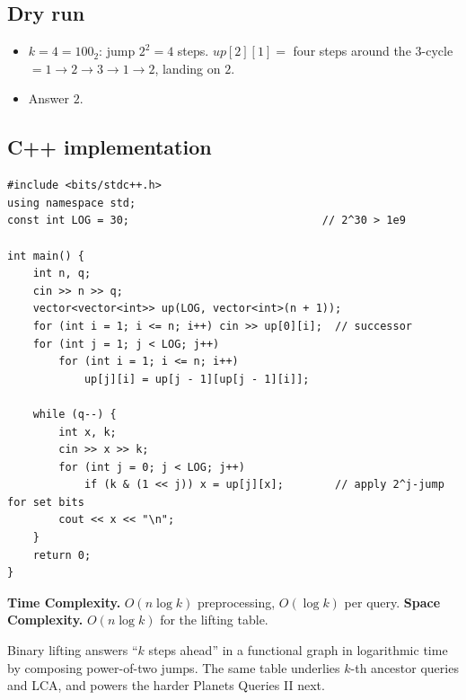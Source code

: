 \subsection*{Dry run}


\begin{itemize}
  \item $k=4=100_2$: jump $2^2=4$ steps. $\textit{up}[2][1]=$ four steps
        around the 3-cycle $=1\to2\to3\to1\to2$, landing on $2$.
  \item Answer $2$.
\end{itemize}

\subsection*{C++ implementation}

\begin{lstlisting}
#include <bits/stdc++.h>
using namespace std;
const int LOG = 30;                              // 2^30 > 1e9

int main() {
    int n, q;
    cin >> n >> q;
    vector<vector<int>> up(LOG, vector<int>(n + 1));
    for (int i = 1; i <= n; i++) cin >> up[0][i];  // successor
    for (int j = 1; j < LOG; j++)
        for (int i = 1; i <= n; i++)
            up[j][i] = up[j - 1][up[j - 1][i]];

    while (q--) {
        int x, k;
        cin >> x >> k;
        for (int j = 0; j < LOG; j++)
            if (k & (1 << j)) x = up[j][x];        // apply 2^j-jump for set bits
        cout << x << "\n";
    }
    return 0;
}
\end{lstlisting}

\begin{complexitybox}
\textbf{Time Complexity.} $O(n\log k)$ preprocessing, $O(\log k)$ per query.
\textbf{Space Complexity.} $O(n\log k)$ for the lifting table.
\end{complexitybox}

\begin{takeawaybox}
Binary lifting answers ``$k$ steps ahead'' in a functional graph in
logarithmic time by composing power-of-two jumps. The same table underlies
$k$-th ancestor queries and LCA, and powers the harder Planets Queries II
next.
\end{takeawaybox}
